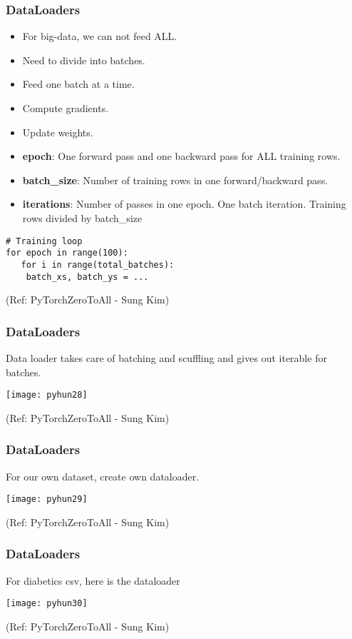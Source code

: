 \begin{frame}[fragile] \frametitle{DataLoaders}
\begin{itemize}
\item For big-data, we can not feed ALL. 
\item Need to divide into batches. 
\item Feed one batch at a time. 
\item Compute gradients.
\item Update weights.
\item \textbf{epoch}: One forward pass and one backward pass for ALL training rows.
\item \textbf{batch\_size}: Number of training rows in one forward/backward pass.
\item \textbf{iterations}: Number of passes in one epoch. One batch iteration. Training rows divided by batch\_size
\end{itemize}
\begin{lstlisting}
# Training loop
for epoch in range(100):
   for i in range(total_batches):
   	batch_xs, batch_ys = ...
\end{lstlisting}

\tiny{(Ref: PyTorchZeroToAll  - Sung Kim)}
\end{frame}

\begin{frame}[fragile] \frametitle{DataLoaders}
Data loader takes care of batching and scuffling and gives out iterable for batches.
\begin{center}
\texttt{[image: pyhun28]}
\end{center}

\tiny{(Ref: PyTorchZeroToAll  - Sung Kim)}
\end{frame}

\begin{frame}[fragile] \frametitle{DataLoaders}
For our own dataset, create own dataloader.
\begin{center}
\texttt{[image: pyhun29]}
\end{center}

\tiny{(Ref: PyTorchZeroToAll  - Sung Kim)}
\end{frame}

\begin{frame}[fragile] \frametitle{DataLoaders}
For diabetics csv, here is the dataloader
\begin{center}
\texttt{[image: pyhun30]}
\end{center}

\tiny{(Ref: PyTorchZeroToAll  - Sung Kim)}
\end{frame}



